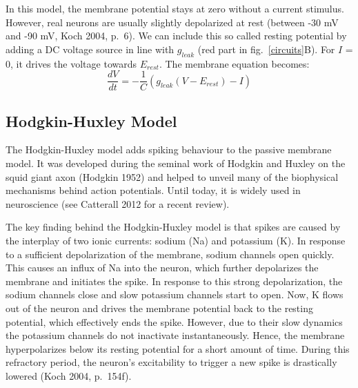 \documentclass[12pt,a4paper,]{report}
\begin{document}
In this model, the membrane potential stays at zero without a current
stimulus. However, real neurons are usually slightly depolarized at rest
(between -30 mV and -90 mV, Koch 2004, p.~6). We can include this so
called resting potential by adding a DC voltage source in line with
$g_{leak}$ (red part in fig.~\ref{circuits}B). For $I$ = 0, it drives
the voltage towards $E_{rest}$. The membrane equation becomes:
%
\begin{equation}
\label{membrane-equation-rest}
\frac{dV}{dt} = - \frac{1}{C} (g_{leak} (V - E_{rest}) - I)
\end{equation}
%

\subsection{Hodgkin-Huxley Model}\label{hodgkin-huxley-model}

The Hodgkin-Huxley model adds spiking behaviour to the passive membrane
model. It was developed during the seminal work of Hodgkin and Huxley on
the squid giant axon (Hodgkin 1952) and helped to unveil many of the
biophysical mechanisms behind action potentials. Until today, it is
widely used in neuroscience (see Catterall 2012 for a recent review).

The key finding behind the Hodgkin-Huxley model is that spikes are
caused by the interplay of two ionic currents: sodium (Na) and potassium
(K). In response to a sufficient depolarization of the membrane, sodium
channels open quickly. This causes an influx of Na into the neuron,
which further depolarizes the membrane and initiates the spike. In
response to this strong depolarization, the sodium channels close and
slow potassium channels start to open. Now, K flows out of the neuron
and drives the membrane potential back to the resting potential, which
effectively ends the spike. However, due to their slow dynamics the
potassium channels do not inactivate instantaneously. Hence, the
membrane hyperpolarizes below its resting potential for a short amount
of time. During this refractory period, the neuron's excitability to
trigger a new spike is drastically lowered (Koch 2004, p.~154f).
\end{document}
